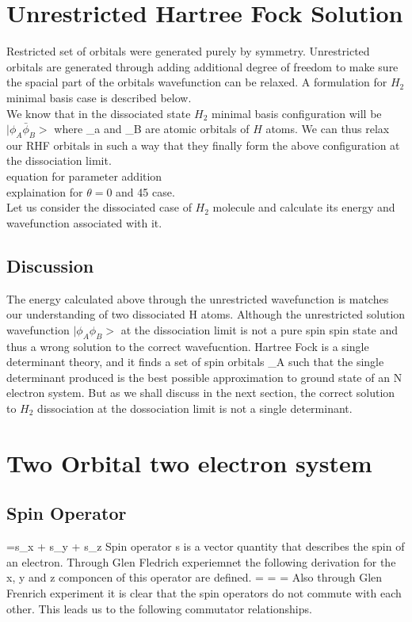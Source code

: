\documentclass[11pt]{article}   	%
\begin{document}
\section{Unrestricted Hartree Fock Solution}
	Restricted set of orbitals were generated purely by symmetry. Unrestricted orbitals are generated through adding additional degree of freedom to make sure the spacial part of the orbitals wavefunction 
	can be relaxed. A formulation for $H_2$ minimal basis case is described below. \\
	We know that in the dissociated state $H_2$ minimal basis configuration will be $|\phi_A \bar{\phi}_B>$ where \phi_a and \phi_B are atomic orbitals of $H$ atoms. We can thus relax our RHF orbitals in such a way that they 
	finally form the above configuration at the dissociation limit. \\
	equation for parameter addition \\
	explaination for $\theta =0$ and 45 case. \\
	Let us consider the dissociated case of $H_2$ molecule and calculate its energy and wavefunction associated with it. \\
	
	\subsection{Discussion}
	The energy calculated above through the unrestricted wavefunction is matches our understanding of two dissociated H atoms. Although the unrestricted solution wavefunction $|\phi_A \phi_B> $ at the dissociation limit is not a pure spin 
	spin state and thus a wrong solution to the correct wavefucntion. Hartree Fock is a single determinant theory, and it finds a set of spin orbitals \Ki_A such that the single determinant produced is the best possible approximation to
	ground state of an N electron system. But as we shall discuss in the next section, the correct solution to $H_2$ dissociation at the dossociation limit is not a single determinant. \\
\section{Two Orbital two electron system}%
	\subsection{Spin Operator}
	 =s_x  + s_y  + s_z 
	Spin operator s is a vector quantity that describes the spin of an electron. Through Glen Fledrich experiemnet the following derivation for the x, y and z componcen of this operator are defined. 
	=
	=
	=
	Also through Glen Frenrich experiment it is clear that the spin operators do not commute with each other. This leads us to the following commutator relationships. \\
	
\end{document}
